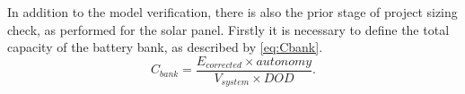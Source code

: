 \documentclass[journal]{IEEEtran}
\begin{document}
%
%
%
%
%
%
%

%
%
In addition to the model verification, there is also the prior stage of project sizing check, as performed for the solar panel. Firstly it is necessary to define the total capacity of the battery bank, as described by \eqref{eq:Cbank}.
\begin{equation}
\label{eq:Cbank}
C_{bank} = \dfrac{E_{corrected} \times autonomy}{V_{system} \times DOD}.
\end{equation}
\end{document}
